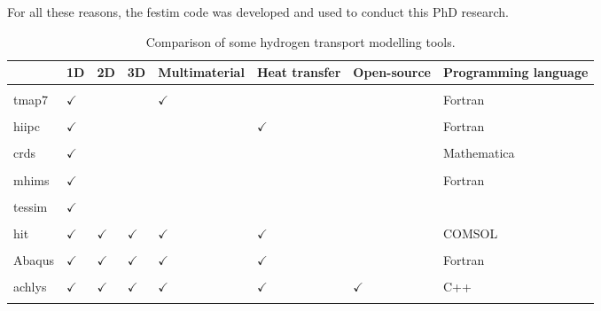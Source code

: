 For all these reasons, the \acrshort{festim} code was developed and used to conduct this PhD research.

\begin{table} [h]
    \centering
    \begin{tabular}{L{2cm} L{0.5cm} L{0.5cm} L{0.6cm} L{1.7cm} l l l }
        & 1D & 2D & 3D & Multimaterial & Heat transfer & Open-source & Programming language \\
        \hline \\
        \acrshort{tmap7} \cite{longhurst_tmap7_2008} & $\checkmark$ & & & $\checkmark$ & & & Fortran\\
        \\
        \acrshort{hiipc} \cite{sang_modelling_2012} & $\checkmark$ & & & & $\checkmark$ & & Fortran\\
        \\
        \acrshort{crds} \cite{matveev_reaction-diffusion_2018} & $\checkmark$ & & & & & & Mathematica \\
        \\
        \acrshort{mhims} \cite{hodille_study_2016} & $\checkmark$ & & & & & & Fortran \\
        \\
        \acrshort{tessim} \cite{schmid_transport_2014} & $\checkmark$ & & & & & & \\
        \\
        \acrshort{hit} \cite{candido_integrated_2020} & $\checkmark$ & $\checkmark$ & $\checkmark$ & $\checkmark$ & $\checkmark$ & & COMSOL\\
        \\
        Abaqus \cite{benannoune_multidimensional_2020} & $\checkmark$ & $\checkmark$ & $\checkmark$ & $\checkmark$ & $\checkmark$ & & Fortran\\
        \\
        \gls{achlys} \cite{stephen-dixon_aurora-multiphysicsachlys_2021} & $\checkmark$ & $\checkmark$ & $\checkmark$ & $\checkmark$ & $\checkmark$ & $\checkmark$ & C++\\
        \\
    \end{tabular}
    \caption{Comparison of some hydrogen transport modelling tools.}
\end{table}

